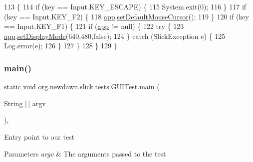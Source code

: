 \begin{DoxyCode}
113                                             \{
114         \textcolor{keywordflow}{if} (key == Input.KEY\_ESCAPE) \{
115             System.exit(0);
116         \}
117         \textcolor{keywordflow}{if} (key == Input.KEY\_F2) \{
118             \mbox{\hyperlink{classorg_1_1newdawn_1_1slick_1_1tests_1_1_g_u_i_test_ab8fc86430409e7a33c9f89928ff238b2}{app}}.\mbox{\hyperlink{classorg_1_1newdawn_1_1slick_1_1_app_game_container_acfe3089f87d1952e61f3d2f1572ee5ee}{setDefaultMouseCursor}}();
119         \}
120         \textcolor{keywordflow}{if} (key == Input.KEY\_F1) \{
121             \textcolor{keywordflow}{if} (\mbox{\hyperlink{classorg_1_1newdawn_1_1slick_1_1tests_1_1_g_u_i_test_ab8fc86430409e7a33c9f89928ff238b2}{app}} != null) \{
122                 \textcolor{keywordflow}{try} \{
123                     \mbox{\hyperlink{classorg_1_1newdawn_1_1slick_1_1tests_1_1_g_u_i_test_ab8fc86430409e7a33c9f89928ff238b2}{app}}.\mbox{\hyperlink{classorg_1_1newdawn_1_1slick_1_1_app_game_container_aa2de68db61ddd3917a8edc0177ebdfe3}{setDisplayMode}}(640,480,\textcolor{keyword}{false});     
124                 \} \textcolor{keywordflow}{catch} (SlickException e) \{
125                     Log.error(e);
126                 \}
127             \}
128         \}
129     \}
\end{DoxyCode}
\mbox{\label{classorg_1_1newdawn_1_1slick_1_1tests_1_1_g_u_i_test_a74116b79237f3665a51d29f9fbb21a04}} 
\subsubsection{\texorpdfstring{main()}{main()}}
{\footnotesize\ttfamily static void org.\+newdawn.\+slick.\+tests.\+G\+U\+I\+Test.\+main (\begin{DoxyParamCaption}\item[{String \mbox{[}$\,$\mbox{]}}]{argv }\end{DoxyParamCaption})\hspace{0.3cm}{\ttfamily [inline]}, {\ttfamily [static]}}

Entry point to our test


\begin{DoxyParams}{Parameters}
{\em argv} & The arguments passed to the test \\
\hline
\end{DoxyParams}

